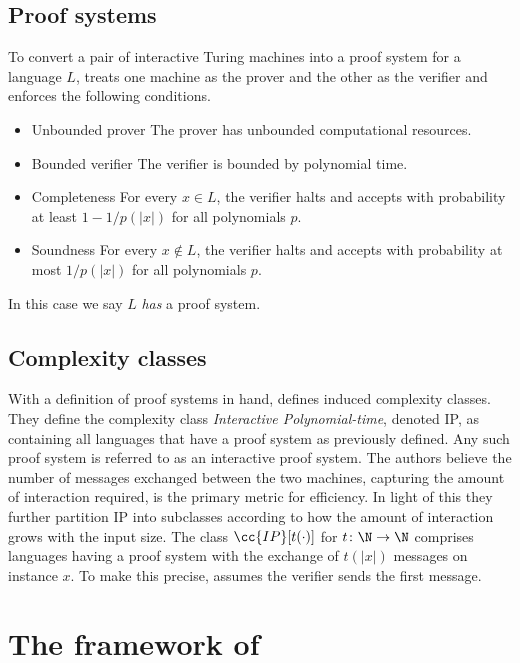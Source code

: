 \subsection{Proof systems}

To convert a pair of interactive Turing machines into a proof system for a language $L$, \cite{GMR85} treats one machine as the prover and the other as the verifier and enforces the following conditions.
\begin{itemize}

    \item{Unbounded prover}
    The prover has unbounded computational resources.

    \item{Bounded verifier}
    The verifier is bounded by polynomial time.

    \item{Completeness}
    For every $x\in L$, the verifier halts and accepts with probability at least $1-1/p(|x|)$ for all polynomials $p$.

    \item{Soundness}
    For every $x\notin L$, the verifier halts and accepts with probability at most $1/p(|x|)$ for all polynomials $p$.

\end{itemize}
In this case we say $L$ \emph{has} a proof system.

\subsection{Complexity classes}

With a definition of proof systems in hand, \cite{GMR85} defines induced complexity classes.
They define the complexity class \emph{Interactive Polynomial-time}, denoted IP, as containing all languages that have a proof system as previously defined.
Any such proof system is referred to as an interactive proof system.
The authors believe the number of messages exchanged between the two machines, capturing the amount of interaction required, is the primary metric for efficiency.
In light of this they further partition IP into subclasses according to how the amount of interaction grows with the input size.
The class $\cc{IP}[t(\cdot)]$ for $t\colon\N\to\N$ comprises languages having a proof system with the exchange of $t(|x|)$ messages on instance $x$.
To make this precise, \cite{GMR85} assumes the verifier sends the first message.


\section{The framework of \cite{Bab85}}

